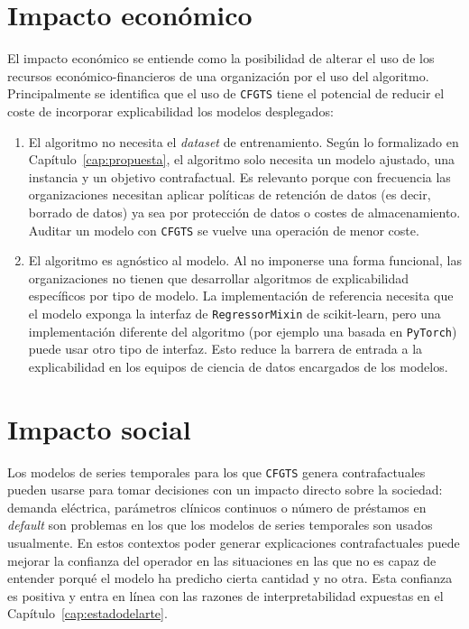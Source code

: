 \documentclass[12pt]{report} %
\begin{document}
\section{Impacto económico}

El impacto económico se entiende como la posibilidad de alterar el uso de los recursos económico-financieros de una organización por el uso del algoritmo. Principalmente se identifica que el uso de \texttt{CFGTS} tiene el potencial de reducir el coste de incorporar explicabilidad los modelos desplegados:
\begin{enumerate}
    \item El algoritmo no necesita el \textit{dataset} de entrenamiento. Según lo formalizado en Capítulo~\ref{cap:propuesta}, el algoritmo solo necesita un modelo ajustado, una instancia y un objetivo contrafactual. Es relevanto porque con frecuencia las organizaciones necesitan aplicar políticas de retención de datos (es decir, borrado de datos) ya sea por protección de datos o costes de almacenamiento. Auditar un modelo con \texttt{CFGTS} se vuelve una operación de menor coste.
    \item El algoritmo es agnóstico al modelo. Al no imponerse una forma funcional, las organizaciones no tienen que desarrollar algoritmos de explicabilidad específicos por tipo de modelo. La implementación de referencia necesita que el modelo exponga la interfaz de \texttt{RegressorMixin} de scikit-learn, pero una implementación diferente del algoritmo (por ejemplo una basada en \texttt{PyTorch}) puede usar otro tipo de interfaz. Esto reduce la barrera de entrada a la explicabilidad en los equipos de ciencia de datos encargados de los modelos.
\end{enumerate}


\section{Impacto social}

Los modelos de series temporales para los que \texttt{CFGTS} genera contrafactuales pueden usarse para tomar decisiones con un impacto directo sobre la sociedad: demanda eléctrica, parámetros clínicos continuos o número de préstamos en \textit{default} son problemas en los que los modelos de series temporales son usados usualmente. En estos contextos poder generar explicaciones contrafactuales puede mejorar la confianza del operador en las situaciones en las que no es capaz de entender porqué el modelo ha predicho cierta cantidad y no otra. Esta confianza es positiva y entra en línea con las razones de interpretabilidad expuestas en el Capítulo~\ref{cap:estadodelarte}.
\end{document}
